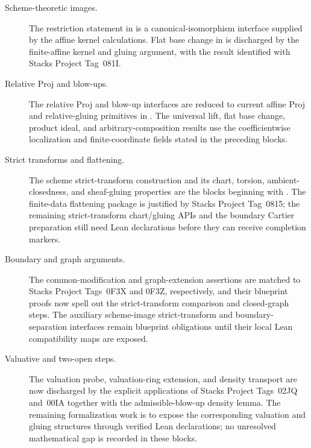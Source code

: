 \begin{description}
  \item[Scheme-theoretic images.]  The restriction statement in
     is a canonical-isomorphism
    interface supplied by the affine kernel calculations.  Flat base change
    in  is discharged by the
    finite-affine kernel and gluing argument, with the result identified with
    Stacks Project Tag~081I.

  \item[Relative Proj and blow-ups.]  The relative Proj and blow-up interfaces
    are reduced to current affine Proj and relative-gluing primitives in
    .  The universal lift, flat
    base change, product ideal, and arbitrary-composition results use the
    coefficientwise localization and finite-coordinate fields stated in the
    preceding blocks.

  \item[Strict transforms and flattening.]  The scheme strict-transform
    construction and its chart, torsion, ambient-closedness, and sheaf-gluing
    properties are the blocks beginning with
    .  The finite-data flattening package is
    justified by Stacks Project Tag~0815; the remaining strict-transform
    chart/gluing APIs and the boundary Cartier preparation still need Lean
    declarations before they can receive completion markers.

  \item[Boundary and graph arguments.]  The common-modification and
    graph-extension assertions are matched to Stacks Project Tags~0F3X and
    0F3Z, respectively, and their blueprint proofs now spell out the
    strict-transform comparison and closed-graph steps.  The auxiliary
    scheme-image strict-transform and boundary-separation interfaces remain
    blueprint obligations until their local Lean compatibility maps are
    exposed.

  \item[Valuative and two-open steps.]  The valuation probe, valuation-ring
    extension, and density transport are now discharged by the explicit
    applications of Stacks Project Tags~02JQ and~00IA together with the
    admissible-blow-up density lemma.  The remaining formalization work is to
    expose the corresponding valuation and gluing structures through verified
    Lean declarations; no unresolved mathematical gap is recorded in these
    blocks.


\end{description}
